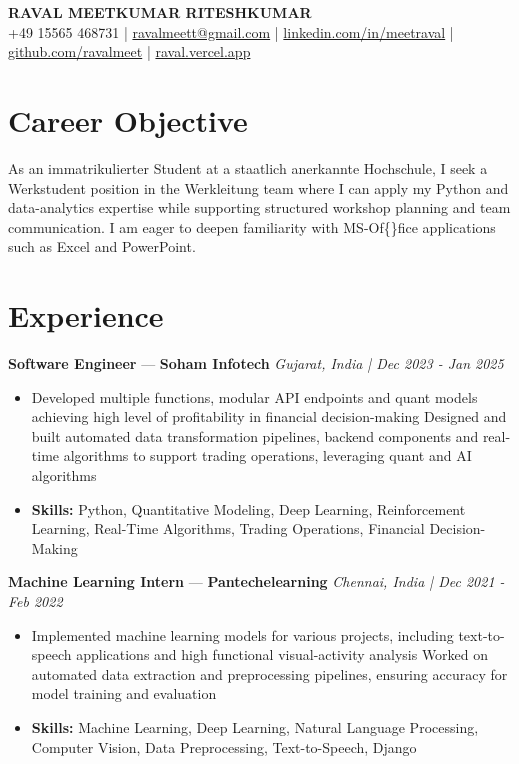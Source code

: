 \documentclass[a4paper,10pt]{article}
\begin{document}
\begin{center}
  {\Large\bfseries RAVAL MEETKUMAR RITESHKUMAR}\\[2pt]
  {\small +49 15565 468731 \;|\; \href{mailto:ravalmeett@gmail.com}{ravalmeett@gmail.com} \;|\; \href{https://www.linkedin.com/in/meetraval/}{linkedin.com/in/meetraval} \;|\; \href{https://github.com/ravalmeet}{github.com/ravalmeet} \;|\; \href{https://raval.vercel.app/}{raval.vercel.app}}
\end{center}
\vspace{-3pt}

\section*{Career Objective}
As an immatrikulierter Student at a staatlich anerkannte Hochschule, I seek a Werkstudent position in the Werkleitung team where I can apply my Python and data-analytics expertise while supporting structured workshop planning and team communication. I am eager to deepen familiarity with MS-Of\{\}fice applications such as Excel and PowerPoint.\par

\section*{Experience}
\textbf{Software Engineer} — \textbf{Soham Infotech} \hfill \textit{Gujarat, India \;|\; Dec 2023 - Jan 2025}\par
\vspace{1pt}
\begin{itemize}
  \item Developed multiple functions, modular API endpoints and quant models achieving high level of profitability in financial decision-making Designed and built automated data transformation pipelines, backend components and real-time algorithms to support trading operations, leveraging quant and AI algorithms
  \item \textbf{Skills:} Python, Quantitative Modeling, Deep Learning, Reinforcement Learning, Real-Time Algorithms, Trading Operations, Financial Decision-Making
\end{itemize}
\vspace{3pt}
\textbf{Machine Learning Intern} — \textbf{Pantechelearning} \hfill \textit{Chennai, India \;|\; Dec 2021 - Feb 2022}\par
\vspace{1pt}
\begin{itemize}
  \item Implemented machine learning models for various projects, including text-to-speech applications and high functional visual-activity analysis Worked on automated data extraction and preprocessing pipelines, ensuring accuracy for model training and evaluation
  \item \textbf{Skills:} Machine Learning, Deep Learning, Natural Language Processing, Computer Vision, Data Preprocessing, Text-to-Speech, Django
\end{itemize}
\end{document}

